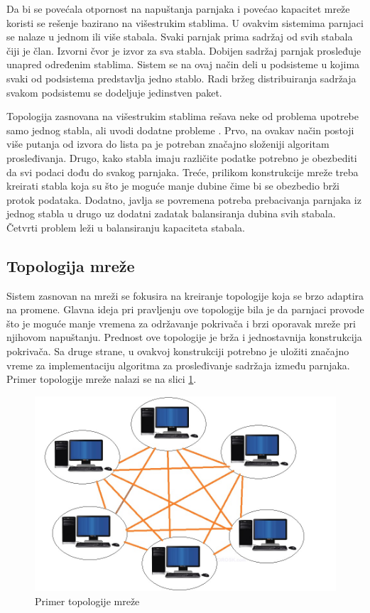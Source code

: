 \documentclass[12pt,oneside]{memoir}
\begin{document}
Da bi se povećala otpornost na napuštanja parnjaka i povećao kapacitet mreže koristi se rešenje bazirano na višestrukim stablima. U ovakvim sistemima parnjaci se nalaze u jednom ili više stabala. Svaki parnjak prima sadržaj od svih stabala čiji je član. Izvorni čvor je izvor za sva stabla. Dobijen sadržaj parnjak prosleđuje unapred određenim stablima. Sistem se na ovaj način deli u podsisteme u kojima svaki od podsistema predstavlja jedno stablo. Radi bržeg distribuiranja sadržaja svakom podsistemu se dodeljuje jedinstven paket.

Topologija zasnovana na višestrukim stablima rešava neke od problema upotrebe samo jednog stabla, ali uvodi dodatne probleme \cite{DeBoever07}. Prvo, na ovakav način postoji više putanja od izvora do lista pa je potreban značajno složeniji algoritam prosleđivanja. Drugo, kako stabla imaju različite podatke potrebno je obezbediti da svi podaci dođu do svakog parnjaka. Treće, prilikom konstrukcije mreže treba kreirati stabla koja su što je moguće manje dubine čime bi se obezbedio brži protok podataka. Dodatno, javlja se povremena potreba prebacivanja parnjaka iz jednog stabla u drugo uz dodatni zadatak balansiranja dubina svih stabala. Četvrti problem leži u balansiranju kapaciteta stabala. 

\subsection{Topologija mreže}
\label{P2P.3.2}

Sistem zasnovan na mreži se fokusira na kreiranje topologije koja se brzo adaptira na promene. Glavna ideja pri pravljenju ove topologije bila je da parnjaci provode što je moguće manje vremena za održavanje pokrivača i brzi oporavak mreže pri njihovom napuštanju. Prednost ove topologije je brža i jednostavnija konstrukcija pokrivača. Sa druge strane, u ovakvoj konstrukciji potrebno je uložiti značajno vreme za implementaciju algoritma za prosleđivanje sadržaja između parnjaka. Primer topologije mreže nalazi se na slici \ref{fig:topologija-mreze}.
 
\begin{figure}[!ht]
  \centering
  \includegraphics[width=1.05\textwidth]{slike/mesh-topology.jpg}
  \caption{Primer topologije mreže}
  \label{fig:topologija-mreze}
\end{figure}
\par
\end{document}
